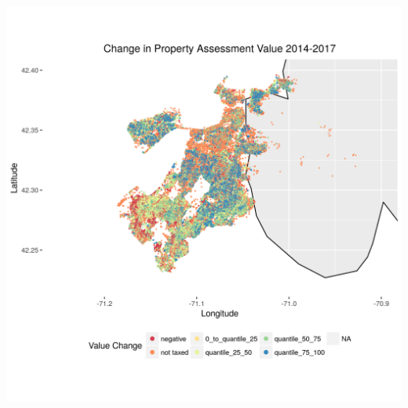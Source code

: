 \documentclass[12pt]{article}
\begin{document}
\includegraphics[scale=0.85]{property_delta2014-2017}


 

\end{document}
